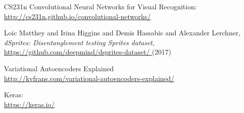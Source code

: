 \begin{thebibliography}{9}

CS231n Convolutional Neural Networks for Visual Recognition:\\
\url{http://cs231n.github.io/convolutional-networks/}

{Loic Matthey and Irina Higgins and Demis Hassabis and Alexander Lerchner},
\textit{dSprites: Disentanglement testing Sprites dataset},\\
\url{https://github.com/deepmind/dsprites-dataset/
} (2017)

Variational Autoencoders Explained\\
\url{http://kvfrans.com/variational-autoencoders-explained/}

Keras:\\
\url{https://keras.io/}

\end{thebibliography}

%
